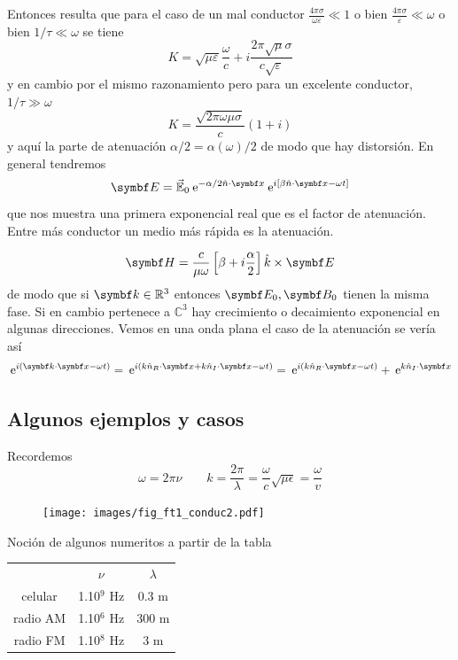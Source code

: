 \documentclass[10pt,oneside]{CBFT_book}
\begin{document}
Entonces resulta que para el caso de un mal conductor $ \frac{4\pi\sigma}{\omega \varepsilon} \ll 1 $ o bien 
$ \frac{4\pi\sigma}{\varepsilon} \ll \omega $ o bien $ 1/\tau \ll \omega $ se tiene 
\[
	K = \sqrt{ \mu \varepsilon }\frac{\omega}{c} + i \frac{2\pi\sqrt{\mu}\sigma}{c\sqrt{\varepsilon}}
\]
y en cambio por el mismo razonamiento pero para un excelente conductor, $1/\tau \gg \omega$
\[
	K = \frac{\sqrt{2\pi\omega\mu\sigma}}{c}( 1 + i )
\]
y aquí la parte de atenuación $\alpha/2 = \alpha(\omega)/2$ de modo que hay distorsión.
En general tendremos
\[
	\vb{E} = \vec{\mathbb{E}}_0 \euler^{-\alpha/2 \hat{n}\cdot\vb{x}} \euler^{i[\beta \hat{n}\cdot\vb{x} - 
\omega t]}
\]
que nos muestra una primera exponencial real que es el factor de atenuación. Entre más conductor un medio más
rápida es la atenuación.

\[
	\vb{H} = \frac{c}{\mu\omega}\left[ \beta + i \frac{\alpha}{2} \right] \hat{k}\times \vb{E}
\]
de modo que si $\vb{k} \in \mathbb{R}^3$ entonces $\vb{E}_0, \vb{B}_0$ tienen la misma fase. Si en cambio 
 pertenece a $\mathbb{C}^3$ hay crecimiento o decaimiento exponencial en algunas direcciones.
Vemos en una onda plana el caso de la atenuación se vería así
\[
	\euler^{i(\vb{k}\cdot\vb{x}-\omega t)} =
	\euler^{i( k\hat{n}_R \cdot\vb{x} + k\hat{n}_I \cdot\vb{x} -\omega t)} =
	\euler^{i( k\hat{n}_R \cdot\vb{x} -\omega t) } + \euler^{ k\hat{n}_I \cdot\vb{x} }
\]

\subsection{Algunos ejemplos y casos}

Recordemos 
\[
	\omega = 2\pi\nu  \qquad k=\frac{2\pi}{\lambda}=\frac{\omega}{c}\sqrt{\mu\epsilon} =\frac{\omega}{v}
\]

\begin{figure}[htb]
	\begin{center}
	\texttt{[image: images/fig\_ft1\_conduc2.pdf]}	 
	\end{center}
	\caption{}
\end{figure} 

Noción de algunos numeritos a partir de la tabla

\begin{center}
\begin{tabular}{ c c c }
& $\nu$ & $\lambda$ \\
celular & 1.10$^9$ Hz & 0.3 m \\
radio AM  & 1.10$^6$ Hz  & 300 m \\
radio FM & 1.10$^8$ Hz & 3 m
\end{tabular}
\end{center}
\end{document}
